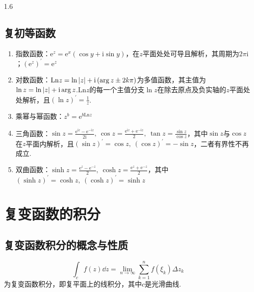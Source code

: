 \documentclass[lang=cn,10pt]{elegantbook}
\renewcommand{\i}{\mathrm{i}}
\begin{document}
\begin{spacing}{1.6}
\section{复初等函数}
\begin{enumerate}
    \item 指数函数：$\mathrm{e}^z=\mathrm{e}^x\left(\cos y+\i\sin y\right)$，在$z$平面处处可导且解析，其周期为$2\pi\i$；$\left(\mathrm{e}^z\right)^{\prime}=\mathrm{e}^z$
    \item 对数函数：$\mathrm{Ln}z=\ln\abs{z}+\i\left(\arg z\pm 2k\pi\right)$为多值函数，其主值为$\ln z=\ln\abs{z}+\i\arg z$.$\mathrm{Ln}z$的每一个主值分支$\ln z$在除去原点及负实轴的$z$平面处处解析，且$\left(\ln z\right)^{\prime}=\frac{1}{z}$.
    \item 乘幂与幂函数：$z^b=\mathrm{e}^{b\mathrm{Ln}z}$
    \item 三角函数：$\sin z=\frac{\mathrm{e}^{\i z}-\mathrm{e}^{-\i z}}{2\i},\ \cos z=\frac{\mathrm{e}^{\i z}+\mathrm{e}^{-\i z}}{2},\ \tan z=\frac{\sin z}{\cos z}$，其中$\sin z$与$\cos z$在$z$平面内解析，且$\left(\sin z\right)^{\prime}=\cos z,\ \left(\cos z\right)^{\prime}=-\sin z$，二者有界性不再成立.
    \item 双曲函数：$\sinh z=\frac{\mathrm{e}^z-\mathrm{e}^{-z}}{2},\ \cosh z=\frac{\mathrm{e}^z+\mathrm{e}^{-z}}{2}$，其中$\left(\sinh z\right)^{\prime}=\cosh z,\ \left(\cosh z\right)^{\prime}=\sinh z$
\end{enumerate}
\chapter{复变函数的积分}
\section{复变函数积分的概念与性质}
\begin{definition}
$$\int_c{f\left(z\right)\dd z=\lim_{n\to\infty}}\sum_{k=1}^n{f\left(\xi_k\right)\Delta z_k}$$
为复变函数积分，即复平面上的线积分，其中$c$是光滑曲线.
\end{definition}

\end{spacing}
\end{document}
